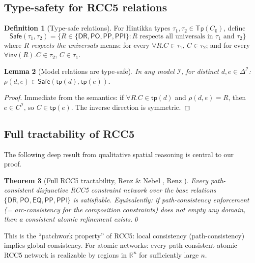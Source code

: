 \documentclass[a4paper,11pt]{article}
\newtheorem{theorem}{Theorem}[section]
\newtheorem{lemma}[theorem]{Lemma}
\theoremstyle{definition}
\newtheorem{definition}[theorem]{Definition}
\newcommand{\DR}{\ensuremath{\mathsf{DR}}}
\newcommand{\PO}{\ensuremath{\mathsf{PO}}}
\newcommand{\EQ}{\ensuremath{\mathsf{EQ}}}
\newcommand{\PP}{\ensuremath{\mathsf{PP}}}
\newcommand{\PPI}{\ensuremath{\mathsf{PPI}}}
\newcommand{\inv}{\ensuremath{\mathsf{inv}}}
\newcommand{\tp}{\ensuremath{\mathsf{tp}}}
\newcommand{\Tp}{\ensuremath{\mathsf{Tp}}}
\newcommand{\Safe}{\ensuremath{\mathsf{Safe}}}
\newcommand{\interp}{\ensuremath{\mathcal{I}}}
\newcommand{\DeltaI}{\ensuremath{\Delta^{\mathcal{I}}}}
\begin{document}
\subsection{Type-safety for RCC5 relations}\label{sec:type-safety}

\begin{definition}[Type-safe relations]\label{def:safe}
For Hintikka types $\tau_1, \tau_2 \in \Tp(C_0)$, define
\[
\Safe(\tau_1, \tau_2) = \{R \in \{\DR,\PO,\PP,\PPI\} :
\text{$R$ respects all universals in $\tau_1$ and $\tau_2$}\}
\]
where $R$ \emph{respects the universals} means: for every
$\forall R.C \in \tau_1$, $C \in \tau_2$; and for every
$\forall\inv(R).C \in \tau_2$, $C \in \tau_1$.
\end{definition}

\begin{lemma}[Model relations are type-safe]\label{lem:model-safe}
In any model $\interp$, for distinct $d, e \in \DeltaI$:
$\rho(d, e) \in \Safe(\tp(d), \tp(e))$.
\end{lemma}

\begin{proof}
Immediate from the semantics: if $\forall R.C \in \tp(d)$ and
$\rho(d, e) = R$, then $e \in C^{\interp}$, so $C \in \tp(e)$.
The inverse direction is symmetric.
\end{proof}

\subsection{Full tractability of RCC5}

The following deep result from qualitative spatial reasoning is
central to our proof.

\begin{theorem}[Full RCC5 tractability, Renz \& Nebel
, Renz
]\label{thm:full-tractability}
Every path-consistent disjunctive RCC5 constraint network over the
base relations $\{\DR, \PO, \EQ, \PP, \PPI\}$ is satisfiable.
Equivalently: if path-consistency enforcement (= arc-consistency for
the composition constraints) does not empty any domain, then a
consistent atomic refinement exists.\qed
\end{theorem}

This is the ``patchwork property'' of RCC5: local consistency
(path-consistency) implies global consistency.  For atomic networks:
every path-consistent atomic RCC5 network is realizable by regions in
$\mathbb{R}^n$ for sufficiently large $n$.
\end{document}
